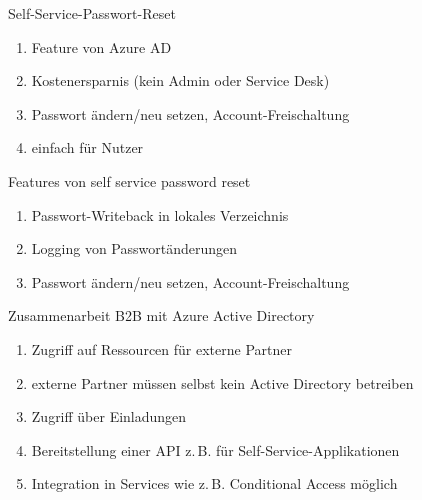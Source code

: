 
\begin{flashcard}[Definition]{Self-Service-Passwort-Reset}
  \begin{enumerate}
    \item Feature von Azure AD
    \item Kostenersparnis (kein Admin oder Service Desk)
    \item Passwort ändern/neu setzen, Account-Freischaltung
    \item einfach für Nutzer
  \end{enumerate}
\end{flashcard}

\begin{flashcard}[Definition]{Features von self service password reset}
  \begin{enumerate}
    \item Passwort-Writeback in lokales Verzeichnis
    \item Logging von Passwortänderungen
    \item Passwort ändern/neu setzen, Account-Freischaltung
  \end{enumerate}
\end{flashcard}


\begin{flashcard}[Definition]{Zusammenarbeit B2B mit Azure Active Directory}
  \begin{enumerate}
    \item Zugriff auf Ressourcen für externe Partner
    \item externe Partner müssen selbst kein Active Directory betreiben
    \item Zugriff über Einladungen
    \item Bereitstellung einer API z.\,B. für Self-Service-Applikationen
    \item Integration in Services wie z.\,B. Conditional Access möglich
  \end{enumerate}
\end{flashcard}

